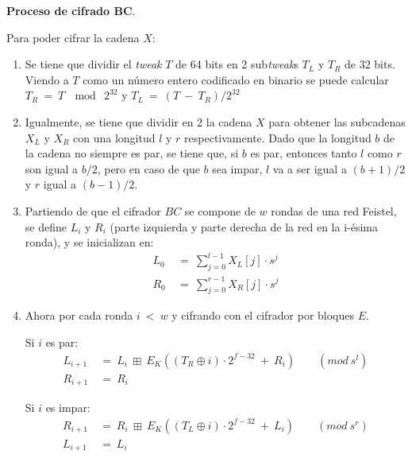 
\textbf{Proceso de cifrado BC}.

Para poder cifrar la cadena $X$:

\begin{enumerate}

  \item Se tiene que dividir el \textit{tweak} $T$ de 64 bits en 2
    sub\textit{tweak}s $T_L$ y $T_R$ de 32 bits. Viendo a $T$ como un número
    entero codificado en binario se puede calcular $T_R\: =\: T\: \mod\: 2^{32}$
    y $T_L\: =\: (T\: -\: T_R) / 2^{32}$

  \item Igualmente, se tiene que dividir en 2 la cadena $X$ para obtener las
    subcadenas $X_L$ y $X_R$ con una longitud $l$ y $r$ respectivamente.
    Dado que la longitud $b$ de la cadena no siempre es par, se tiene que, si
    $b$ es par, entonces tanto $l$ como $r$ son igual a $b/2$, pero en caso
    de que $b$ sea impar, $l$ va a ser igual a $(b+1)/2$ y $r$ igual a
    $(b-1)/2$.

  \item Partiendo de que el cifrador $BC$ se compone de $w$ rondas de una red
    Feistel, se define $L_i$ y $R_i$ (parte izquierda y parte derecha de la
    red en la i-ésima ronda), y se inicializan en:
    \begin{align}
      L_0\: &=\: \sum_{j=0}^{l-1} X_L[j] \cdot s^j \\
      R_0\: &=\: \sum_{j=0}^{r-1} X_R[j] \cdot s^j
    \end{align}

  \item Ahora por cada ronda $i\: <\: w$ y cifrando con el cifrador por
    bloques $E$.

    Si $i$ es par:
    \begin{align}
      L_{i+1}\: &=\: L_i\: \boxplus\:
                    E_K((T_R \oplus i) \cdot 2^{f-32}\: +\: R_i)\qquad
                    (mod\ s^l) \\
      R_{i+1}\: &=\: R_i
    \end{align}

    Si $i$ es impar:
    \begin{align}
      R_{i+1}\: &=\: R_i\: \boxplus\:
                    E_K((T_L \oplus i) \cdot 2^{f-32}\: +\: L_i)\qquad
                    (mod\ s^r) \\
      L_{i+1}\: &=\: L_i
    \end{align}


\end{enumerate}
